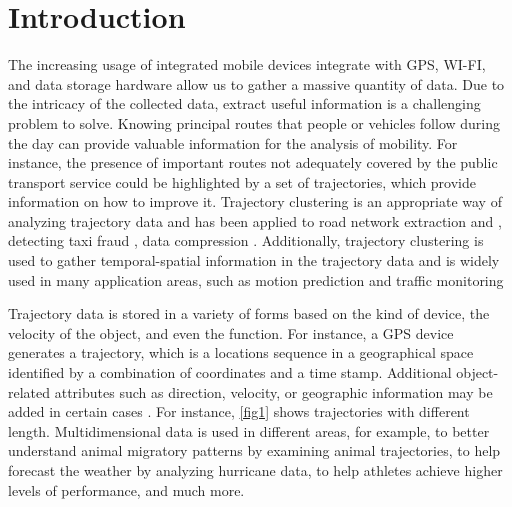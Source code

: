 \documentclass[a4paper, 12pt]{article}
\begin{document}




\section{Introduction}
The increasing usage of integrated mobile devices integrate with GPS, WI-FI, and data storage hardware allow us to gather a massive quantity of data. Due to the intricacy of the collected data, extract useful information is a challenging problem to solve. Knowing principal routes that people or vehicles follow during the day can provide valuable information for the analysis of mobility. For instance, the presence of important routes not adequately covered by the public transport service could be highlighted by a set of trajectories, which provide information on how to improve it. Trajectory clustering is an appropriate way of analyzing trajectory data and has been applied to road network extraction \citep{mariescu2018cellnet, ahmed2015comparison} and \citep{biagioni2012inferring}, detecting taxi fraud \citep{liu2013fraud}, data compression \citep{chen2012compression}. Additionally, trajectory clustering is used to gather temporal-spatial information in the trajectory data and is widely used in many application areas, such as motion prediction \citep{chen2010searching} and traffic monitoring \citep{atev2006learning}

Trajectory data is stored in a variety of forms based on the kind of device, the velocity of the object, and even the function. For instance, a GPS device generates a trajectory, which is a locations sequence in a geographical space identified by a combination of coordinates and a time stamp. Additional object-related attributes such as direction, velocity, or geographic information may be added in certain cases \citep{ying2011semantic, ying2010mining}. For instance, \autoref{fig1} shows trajectories with different length. Multidimensional data is used in different areas, for example, to better understand animal migratory patterns by examining animal trajectories, to help forecast the weather by analyzing hurricane data, to help athletes achieve higher levels of performance, and much more.  
\end{document}
